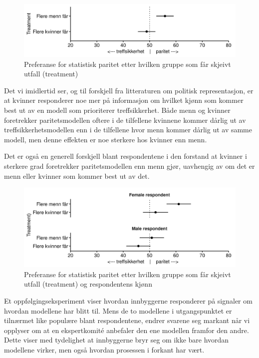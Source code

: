 \documentclass[
  12pt,
  a4paper, 12pt]{article}
\begin{document}
\begin{figure}

{\centering \includegraphics[width=0.9\linewidth]{figs/png/fig_parity_treat_avg} 

}

\caption{Preferanse for statistisk paritet etter hvilken gruppe som får skjeivt utfall (treatment)}\label{fig:unnamed-chunk-30}
\end{figure}

Det vi imidlertid ser, og til forskjell fra litteraturen om politisk representasjon, er at kvinner responderer noe mer på informasjon om hvilket kjønn som kommer best ut av en modell som prioriterer treffsikkerhet.
Både menn og kvinner foretrekker paritetsmodellen oftere i de tilfellene kvinnene kommer dårlig ut av treffsikkerhetsmodellen enn i de tilfellene hvor menn kommer dårlig ut av samme modell, men denne effekten er noe sterkere hos kvinner enn menn.

Det er også en generell forskjell blant respondentene i den forstand at kvinner i sterkere grad foretrekker paritetsmodellen enn menn gjør, uavhengig av om det er menn eller kvinner som kommer best ut av det.

\begin{figure}

{\centering \includegraphics[width=0.9\linewidth]{figs/png/fig_parity_treat_avg_by_gender} 

}

\caption{Preferanse for statistisk paritet etter hvilken gruppe som får skjeivt utfall (treatment) og respondentens kjønn}\label{fig:unnamed-chunk-31}
\end{figure}

Et oppfølgingseksperiment viser hvordan innbyggerne responderer på signaler om hvordan modellene har blitt til.
Mens de to modellene i utgangspunktet er tilnærmet like populære blant respondentene, endrer svarene seg markant når vi opplyser om at en ekspertkomité anbefaler den ene modellen framfor den andre.
Dette viser med tydelighet at innbyggerne bryr seg om ikke bare hvordan modellene virker, men også hvordan prosessen i forkant har vært.
\end{document}

